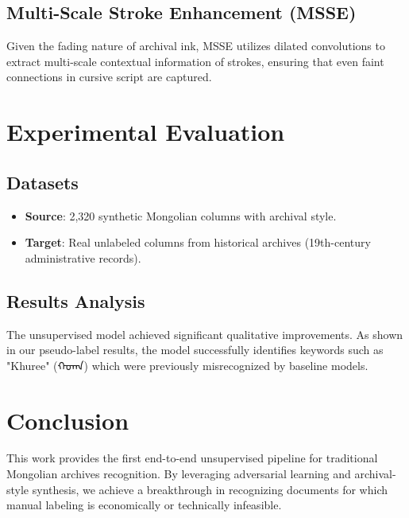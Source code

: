 \documentclass[twocolumn]{article}
\begin{document}
\subsection{Multi-Scale Stroke Enhancement (MSSE)}
Given the fading nature of archival ink, MSSE utilizes dilated convolutions to extract multi-scale contextual information of strokes, ensuring that even faint connections in cursive script are captured.

\section{Experimental Evaluation}
\subsection{Datasets}
\begin{itemize}
    \item \textbf{Source}: 2,320 synthetic Mongolian columns with archival style.
    \item \textbf{Target}: Real unlabeled columns from historical archives (19th-century administrative records).
\end{itemize}

\subsection{Results Analysis}
The unsupervised model achieved significant qualitative improvements. As shown in our pseudo-label results, the model successfully identifies keywords such as "Khuree" (ᠬᠣᠠᠠᠨ) which were previously misrecognized by baseline models.

\section{Conclusion}
This work provides the first end-to-end unsupervised pipeline for traditional Mongolian archives recognition. By leveraging adversarial learning and archival-style synthesis, we achieve a breakthrough in recognizing documents for which manual labeling is economically or technically infeasible.
\end{document}
